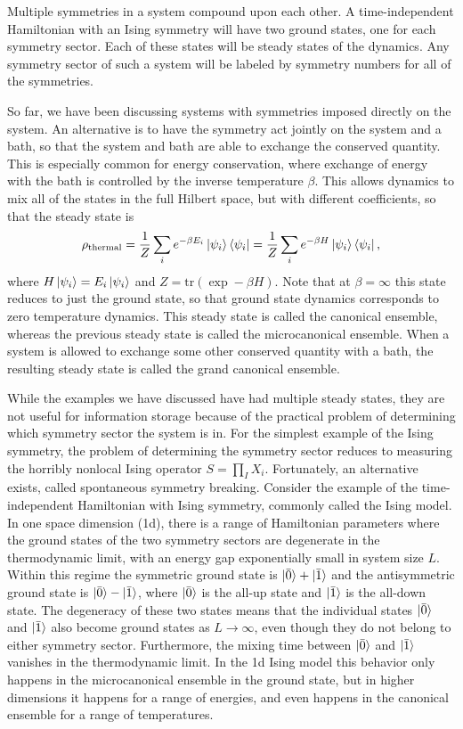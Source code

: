 Multiple symmetries in a system compound upon each other. A time-independent Hamiltonian with an Ising symmetry will have two ground states, one for each symmetry sector. Each of these states will be steady states of the dynamics. Any symmetry sector of such a system will be labeled by symmetry numbers for all of the symmetries.

So far, we have been discussing systems with symmetries imposed directly on the system. An alternative is to have the symmetry act jointly on the system and a bath, so that the system and bath are able to exchange the conserved quantity. This is especially common for energy conservation, where exchange of energy with the bath is controlled by the inverse temperature $\beta$. This allows dynamics to mix all of the states in the full Hilbert space, but with different coefficients, so that the steady state is
\begin{equation}
\rho_\text{thermal} = \frac{1}{Z} \sum_i e^{-\beta E_i} \ket{\psi_i} \bra{\psi_i} = \frac{1}{Z} \sum_i e^{-\beta H} \ket{\psi_i} \bra{\psi_i},
\end{equation}
where $H\ket{\psi_i} = E_i \ket{\psi_i}$ and $Z = \text{tr}(\exp -\beta H)$. Note that at $\beta=\infty$ this state reduces to just the ground state, so that ground state dynamics corresponds to zero temperature dynamics.
This steady state is called the canonical ensemble, whereas the previous steady state is called the microcanonical ensemble. When a system is allowed to exchange some other conserved quantity with a bath, the resulting steady state is called the grand canonical ensemble. 

While the examples we have discussed have had multiple steady states, they are not useful for information storage because of the practical problem of determining which symmetry sector the system is in. For the simplest example of the Ising symmetry, the problem of determining the symmetry sector reduces to measuring the horribly nonlocal Ising operator $S = \prod_I X_i$. Fortunately, an alternative exists, called spontaneous symmetry breaking. Consider the example of the time-independent Hamiltonian with Ising symmetry, commonly called the Ising model. In one space dimension (1d), there is a range of Hamiltonian parameters where the ground states of the two symmetry sectors are degenerate in the thermodynamic limit, with an energy gap exponentially small in system size $L$. Within this regime the symmetric ground state is $\ket{\bar{0}}+\ket{\bar{1}}$ and the antisymmetric ground state is $\ket{\bar{0}}-\ket{\bar{1}}$, where $\ket{\bar{0}}$ is the all-up state and $\ket{\bar{1}}$ is the all-down state. The degeneracy of these two states means that the individual states $\ket{\bar{0}}$ and $\ket{\bar{1}}$ also become ground states as $L\to \infty$, even though they do not belong to either symmetry sector. Furthermore, the mixing time between $\ket{\bar{0}}$ and $\ket{\bar{1}}$ vanishes in the thermodynamic limit. In the 1d Ising model this behavior only happens in the microcanonical ensemble in the ground state, but in higher dimensions it happens for a range of energies, and even happens in the canonical ensemble for a range of temperatures. 

